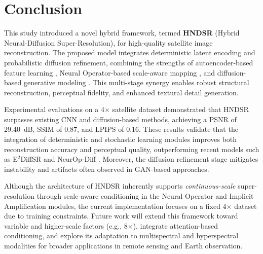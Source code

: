 \documentclass[conference]{IEEEtran}
\begin{document}
\section{Conclusion}

This study introduced a novel hybrid framework, termed \textbf{HNDSR} (Hybrid Neural-Diffusion Super-Resolution), for high-quality satellite image reconstruction. The proposed model integrates deterministic latent encoding and probabilistic diffusion refinement, combining the strengths of autoencoder-based feature learning \cite{lim2017enhanced, ledig2017photo}, Neural Operator-based scale-aware mapping \cite{li2020fourier}, and diffusion-based generative modeling \cite{ho2020denoising, saharia2022image, rombach2022high}. This multi-stage synergy enables robust structural reconstruction, perceptual fidelity, and enhanced textural detail generation.

Experimental evaluations on a 4$\times$ satellite dataset \cite{tudela2023dataset} demonstrated that HNDSR surpasses existing CNN and diffusion-based methods, achieving a PSNR of 29.40~dB, SSIM of 0.87, and LPIPS of 0.16. These results validate that the integration of deterministic and stochastic learning modules improves both reconstruction accuracy and perceptual quality, outperforming recent models such as E$^2$DiffSR \cite{e2diffsr} and NeurOp-Diff \cite{neurOpDiff}. Moreover, the diffusion refinement stage mitigates instability and artifacts often observed in GAN-based approaches.

Although the architecture of HNDSR inherently supports \textit{continuous-scale} super-resolution through scale-aware conditioning in the Neural Operator and Implicit Amplification modules, the current implementation focuses on a fixed 4$\times$ dataset due to training constraints. Future work will extend this framework toward variable and higher-scale factors (e.g., 8$\times$), integrate attention-based conditioning, and explore its adaptation to multispectral and hyperspectral modalities for broader applications in remote sensing and Earth observation.







% 
% 
\end{document}
